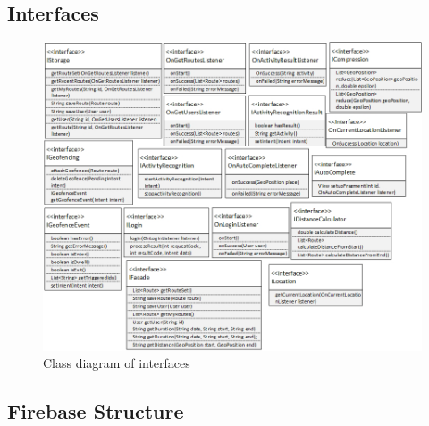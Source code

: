 

\subsection{Interfaces}
\label{app:interfaces}

\begin{figure}[H]
    \centering
    \hspace*{-1.73in}
    \includegraphics[scale=0.65]{Graphics/Images/Interfaces.png}
    \caption{Class diagram of interfaces}
    \label{fig:interfaces}
\end{figure}


\subsection{Firebase Structure}

